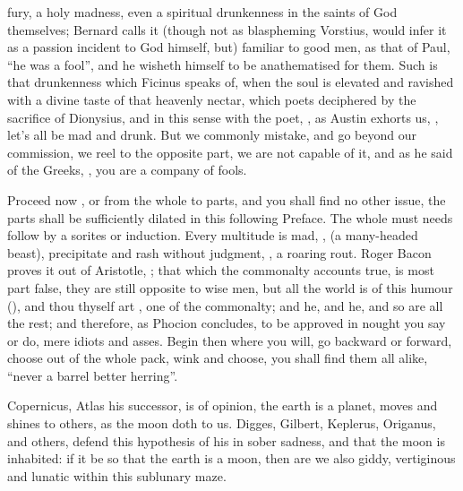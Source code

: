 fury, a holy madness, even a spiritual drunkenness in the saints of God
themselves;  Bernard calls it (though not as blaspheming
Vorstius, would infer it as a passion incident to God
himself, but) familiar to good men, as that of Paul,  \enquote{he was a
fool}, \etc{} and  he wisheth himself to be
anathematised for them. Such is that drunkenness which Ficinus speaks of, when
the soul is elevated and ravished with a divine taste of that heavenly nectar,
which poets deciphered by the sacrifice of Dionysius, and in this sense with
the poet, , as Austin exhorts us, , let's all be mad and drunk.
But we commonly mistake, and go beyond our commission, we reel to the opposite
part, we are not capable of it, and as
he said of the Greeks, , \etc{} you are a company of fools.

Proceed now , or from the whole to parts, and you shall
find no other issue, the parts shall be sufficiently dilated in this following
Preface. The whole must needs follow by a sorites or induction. Every multitude
is mad, , (a many-headed
beast), precipitate and rash without judgment, , a roaring
rout. Roger Bacon proves it out of Aristotle, ;
that which the commonalty accounts true, is most part false, they are still
opposite to wise men, but all the world is of this humour (), and
thou thyself art , one of the commonalty; and he, and he, and so
are all the rest; and therefore, as Phocion concludes, to be approved in nought
you say or do, mere idiots and asses. Begin then where you will, go backward or
forward, choose out of the whole pack, wink and choose, you shall find them all
alike, \enquote{never a barrel better herring}.

Copernicus, Atlas his successor, is of opinion, the earth is a planet, moves
and shines to others, as the moon doth to us. Digges, Gilbert, Keplerus,
Origanus, and others, defend this hypothesis of his in sober sadness, and that
the moon is inhabited: if it be so that the earth is a moon, then are we also
giddy, vertiginous and lunatic within this sublunary maze.

